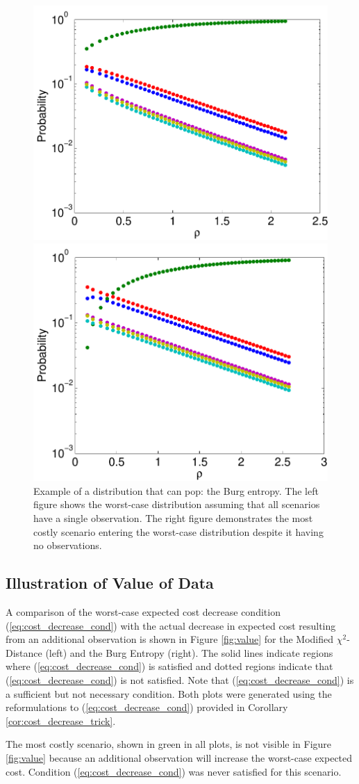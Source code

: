 \documentclass[ijoc,letterpaper]{informs3} %
\begin{document}
\begin{figure}
	\FIGURE
	{%
		\includegraphics*[width=.42\textwidth]{images/burg}%
		\includegraphics*[width=.42\textwidth]{images/burg_zero}%
	}
	{
		Example of a distribution that can pop: the Burg entropy.
		The left figure shows the worst-case distribution assuming that all scenarios have a single observation.
		The right figure demonstrates the most costly scenario entering the worst-case distribution despite it having no observations.
		\label{fig:pop}
	}
	{}
\end{figure}

\subsection{Illustration of Value of Data}
\label{ssec:numerical_value_of_data}

A comparison of the worst-case expected cost decrease condition (\ref{eq:cost_decrease_cond}) with the actual decrease in expected cost resulting from an additional observation is shown in Figure \ref{fig:value} for the Modified $\chi^2$-Distance (left) and the Burg Entropy (right).
The solid lines indicate regions where (\ref{eq:cost_decrease_cond}) is satisfied and dotted regions indicate that (\ref{eq:cost_decrease_cond}) is not satisfied.
Note that (\ref{eq:cost_decrease_cond}) is a sufficient but not necessary condition.
Both plots were generated using the reformulations to (\ref{eq:cost_decrease_cond}) provided in Corollary \ref{cor:cost_decrease_trick}.

The most costly scenario, shown in green in all plots, is not visible in Figure \ref{fig:value} because an additional observation will increase the worst-case expected cost.
Condition (\ref{eq:cost_decrease_cond}) was never satisfied for this scenario.
\end{document}
